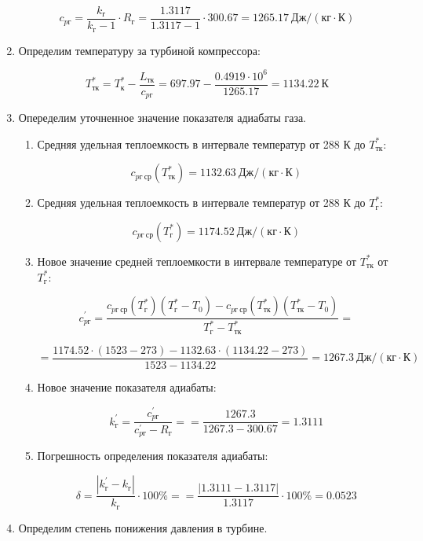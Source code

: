 \documentclass[a4paper,12pt]{article}
\begin{document}
\begin{enumerate}
	\[
	c_{pг} = \frac{ k_г }{ k_г - 1 } \cdot R_г = 
			\frac{ 1.3117 }{ 1.3117 - 1 } \cdot 300.67 = 
			1265.17\ Дж / (кг \cdot К)
	\]
	
	\item Определим температуру за турбиной компрессора:
	
	\[
	T_{тк}^* = T_к^* - \frac{ L_{тк} }{ c_{pг} } = 
			697.97 - \frac{ 0.4919 \cdot 10^6  }{ 1265.17 } = 
			1134.22\ К
	\]
	
	\item Опеределим уточненное значение показателя адиабаты газа.
	
	\begin{enumerate}
	
		\item Средняя удельная теплоемкость в интервале температур от 288 К до $ T_{тк}^* $:
		
		\[
		c_{pг\ ср} (T_{тк}^*) = 1132.63\ Дж / (кг \cdot К)
		\]
		
		\item Средняя удельная теплоемкость в интервале температур от 288 К до $ T_{г}^* $:
		
		\[
		c_{pг\ ср} (T_{г}^*) = 1174.52\ Дж / (кг \cdot К)
		\]
		
		\item Новое значение средней теплоемкости в интервале температуре от $ T_{тк}^* $ от $ T_{г}^* $:
		
		\[c_{pг}^\prime = \frac{
		c_{pг\ ср}(T_г^*) (T_г^* - T_0) - c_{pг\ ср}(T_{тк}^*) (T_{тк}^* - T_0)
		}{
		T_г^* - T_{тк}^*} = \]
		
		\[ =\frac{
		1174.52 \cdot (1523 - 273) - 
		1132.63 \cdot (1134.22 - 273)
		}{
		1523 - 1134.22} = 
		1267.3 \ Дж / (кг \cdot К)
		\]
		
		\item Новое значение показателя адиабаты:
		
		\[
		k_{г}^\prime = \frac{ c_{pг}^\prime }{ c_{pг}^\prime - R_г } = 
				= \frac{ 1267.3 }{ 1267.3 - 300.67 } =
				1.3111
		\]
		
		\item Погрешность определения показателя адиабаты:
		
		\[
		\delta = \frac{ \left| k_{г}^\prime - k_{г} \right| }{ k_{г} } \cdot 100 \% =
				= \frac{ \left| 1.3111 - 1.3117 \right| }{ 1.3117 } \cdot 100 \%
				= 0.0523
		\]
	
	\end{enumerate}
	
	\item Определим степень понижения давления в турбине.
	

\end{enumerate}
\end{document}
